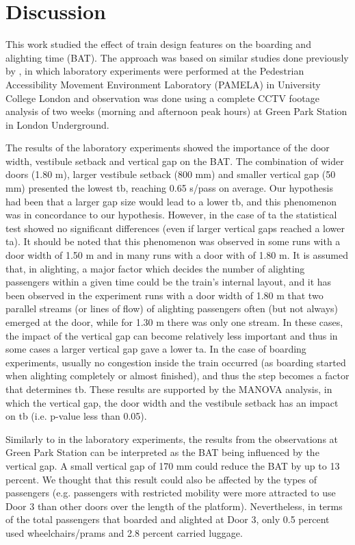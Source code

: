 \section{Discussion}
\label{sec:5}

This work studied the effect of train design features on the boarding and alighting time (BAT). The approach was based on similar studies done previously by \cite{Ref26,Ref27,Ref28,Ref29,Ref30}, in which laboratory experiments were performed at the Pedestrian Accessibility Movement Environment Laboratory (PAMELA) in University College London and observation was done using a complete CCTV footage analysis of two weeks (morning and afternoon peak hours) at Green Park Station in London Underground. 

The results of the laboratory experiments showed the importance of the door width, vestibule setback and vertical gap on the BAT. The combination of wider doors (1.80 m), larger vestibule setback (800 mm) and smaller vertical gap (50 mm) presented the lowest tb, reaching 0.65 s/pass on average. Our hypothesis had been that a larger gap size would lead to a lower tb, and this phenomenon was in concordance to our hypothesis. However, in the case of ta the statistical test showed no significant differences (even if larger vertical gaps reached a lower ta). It should be noted that this phenomenon was observed in some runs with a door width of 1.50 m and in many runs with a door with of 1.80 m. It is assumed that, in alighting, a major factor which decides the number of alighting passengers within a given time could be the train’s internal layout, and it has been observed in the experiment runs with a door width of 1.80 m that two parallel streams (or lines of flow) of alighting passengers often (but not always) emerged at the door, while for 1.30 m there was only one stream. In these cases, the impact of the vertical gap can become relatively less important and thus in some cases a larger vertical gap gave a lower ta. In the case of boarding experiments, usually no congestion inside the train occurred (as boarding started when alighting completely or almost finished), and thus the step becomes a factor that determines tb. These results are supported by the MANOVA analysis, in which the vertical gap, the door width and the vestibule setback has an impact on tb (i.e. p-value less than 0.05). 

Similarly to in the laboratory experiments, the results from the observations at Green Park Station can be interpreted as the BAT being influenced by the vertical gap. A small vertical gap of 170 mm could reduce the BAT by up to 13 percent. We thought that this result could also be affected by the types of passengers (e.g. passengers with restricted mobility were more attracted to use Door 3 than other doors over the length of the platform). Nevertheless, in terms of the total passengers that boarded and alighted at Door 3, only 0.5 percent used wheelchairs/prams and 2.8 percent carried luggage. 

